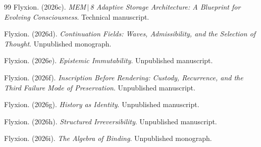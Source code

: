 \documentclass[11pt]{article}
\begin{document}
\begin{thebibliography}{99}
Flyxion. (2026c). \emph{MEM\,$|$\,8 Adaptive Storage Architecture: A Blueprint for Evolving Consciousness}. Technical manuscript.

Flyxion. (2026d). \emph{Continuation Fields: Waves, Admissibility, and the Selection of Thought}. Unpublished monograph.

Flyxion. (2026e). \emph{Epistemic Immutability}. Unpublished manuscript.

Flyxion. (2026f). \emph{Inscription Before Rendering: Custody, Recurrence, and the Third Failure Mode of Preservation}. Unpublished manuscript.

Flyxion. (2026g). \emph{History as Identity}. Unpublished manuscript.

Flyxion. (2026h). \emph{Structured Irreversibility}. Unpublished manuscript.

Flyxion. (2026i). \emph{The Algebra of Binding}. Unpublished monograph.

\end{thebibliography}
\end{document}
